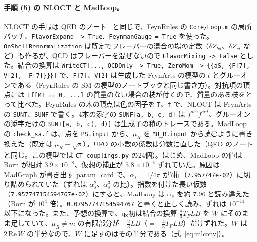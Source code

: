 \documentclass[a4paper,10pt]{ltjsarticle}
\begin{document}
\paragraph{手順 (5) の NLOCT と MadLoop。}NLOCT の手順は QED のノート~\cite{qednote} と同じで、FeynRules の \texttt{Core/Loop.m} の局所パッチ、\texttt{FlavorExpand -> True}、\texttt{FeynmanGauge = True} を使った。\texttt{OnShellRenormalization} は既定でフレーバーの混合の場の定数（$\delta Z_{bd}$、$\delta Z_{ct}$ など）も作るが、QCD はフレーバーを混ぜないので \texttt{FlavorMixing -> False} とした。結合の換算は \texttt{WriteCT[..., QCDOnly -> True, ZeroMom -> \{\{aS, \{F[7], V[2], -F[7]\}\}\}]} で、\texttt{F[7]}、\texttt{V[2]} は生成した FeynArts の模型の $t$ とグルーオンである（FeynRules の SM の模型のノートブックと同じ書き方）。対抗項の頂点には \texttt{If[MT == 0, ...]} の質量のない場合の枝が付くので、質量のある枝をとって比べた。FeynRules の木の頂点は色の因子を \texttt{T}、\texttt{f} で、NLOCT は FeynArts の \texttt{SUNT}、\texttt{SUNF} で書く。4本の添字の \texttt{SUNF[a, b, c, d]} は $f^{abe}f^{ecd}$、グルーオンの添字だけの \texttt{SUNT[a, b, c(, d)]} は生成子の積のトレースである。MadLoop の \texttt{check\_sa.f} は、点を \texttt{PS.input} から、$\mu_R$ を \texttt{MU\_R.input} から読むように書き換えた（既定は $\mu_R=\sqrt s$）。UFO の小数の係数は分数に直した（QED のノートと同じ。この模型では \texttt{CT\_couplings.py} の24個）。はじめ、MadLoop の値は Born が相対 $3.9\times10^{-8}$、仮想の補正が $5.8\times10^{-8}$ ずれていた。原因は MadGraph が書き出す param\_card で、$\alpha_s=1/4\pi$ が7桁（\texttt{7.957747e-02}）に切り詰められていた（ずれは $\alpha_s^2$、$\alpha_s^3$ の比）。指数を付けた長い仮数（\texttt{7.957747154594767e-02}）にすると、MadLoop は $\alpha_s$ を約 $7.96$ と読み違えた（Born が $10^4$ 倍）。\texttt{0.07957747154594767} と書くと正しく読み、ずれは $10^{-14}$ 以下になった。また、予想の換算で、最初は結合の換算 $\frac83T_FLB$ を $W$ にそのまま足していて、$\mu_R\ne m$ の有限部分が $-\frac23LB$（$=-\frac43T_FLB$）だけずれた。$W$ は $2\,\mathrm{Re}\,W$ の半分なので、$W$ に足すのはその半分である（式~\eqref{eq:mlconv}）。
\end{document}
